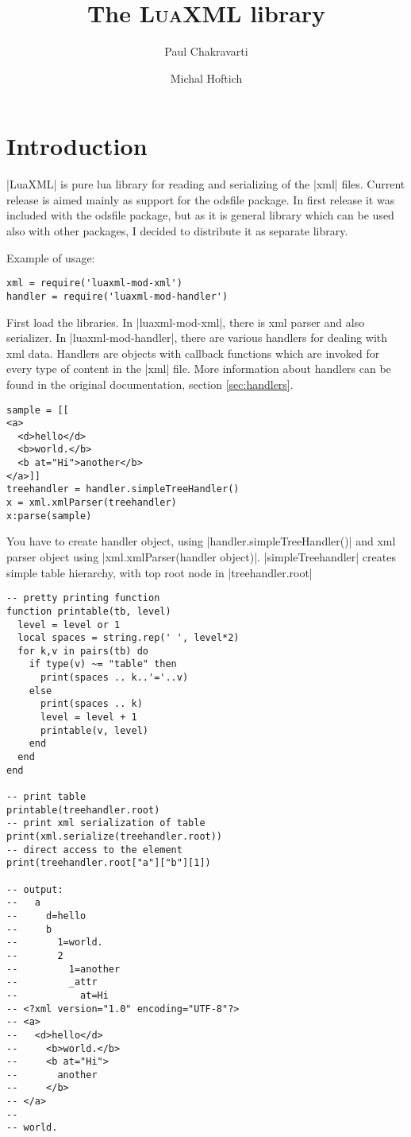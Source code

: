 \documentclass{ltxdoc}
\begin{document}
	\title{The \textsc{LuaXML} library}
	\author{Paul Chakravarti \and Michal Hoftich}
	\maketitle
\tableofcontents
\section*{Introduction}

|LuaXML| is pure lua library for reading and serializing of the |xml| files.
Current release is aimed mainly as support for the odsfile package. 
In first release it was included with the odsfile package,
but as it is general library which can be used also with other packages, 
I decided to distribute it as separate library.

\noindent Example of usage:

\begin{verbatim}
xml = require('luaxml-mod-xml')
handler = require('luaxml-mod-handler')
\end{verbatim} 

First load the libraries. In |luaxml-mod-xml|, there is xml parser and also serializer. In |luaxml-mod-handler|, there are various handlers for dealing with xml data. Handlers are objects with callback functions which are invoked for every type of content in the |xml| file. More information about handlers can be found in the original documentation, section \ref{sec:handlers}.
\begin{verbatim}
sample = [[
<a>
  <d>hello</d>
  <b>world.</b>
  <b at="Hi">another</b>
</a>]]
treehandler = handler.simpleTreeHandler()
x = xml.xmlParser(treehandler)
x:parse(sample)
\end{verbatim} 

You have to create handler object, using |handler.simpleTreeHandler()| and xml parser object using |xml.xmlParser(handler object)|. |simpleTreehandler| creates simple table hierarchy, with top root node in |treehandler.root|
\begin{verbatim}
-- pretty printing function
function printable(tb, level)
  level = level or 1
  local spaces = string.rep(' ', level*2)
  for k,v in pairs(tb) do
    if type(v) ~= "table" then
      print(spaces .. k..'='..v)
    else
      print(spaces .. k)
      level = level + 1
      printable(v, level)
    end
  end
end

-- print table
printable(treehandler.root)
-- print xml serialization of table
print(xml.serialize(treehandler.root))
-- direct access to the element
print(treehandler.root["a"]["b"][1])

-- output:
--   a
--     d=hello
--     b
--       1=world.
--       2
--         1=another
--         _attr
--           at=Hi
-- <?xml version="1.0" encoding="UTF-8"?>
-- <a>
--   <d>hello</d>
--     <b>world.</b>
--     <b at="Hi">
--       another
--     </b>
-- </a>
-- 
-- world.
\end{verbatim}
\end{document}
